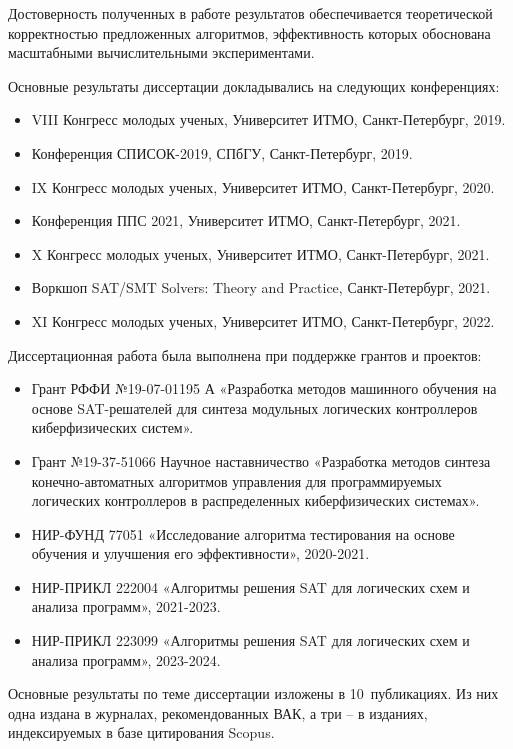 {\reliability}
%
Достоверность полученных в работе результатов обеспечивается теоретической корректностью предложенных алгоритмов, эффективность которых обоснована масштабными вычислительными экспериментами.


\probation
%
Основные результаты диссертации докладывались на следующих конференциях:
\begin{itemize}[beginpenalty=10000]
    \item VIII Конгресс молодых ученых, Университет ИТМО, Санкт-Петербург, 2019.
    \item Конференция СПИСОК-2019, СПбГУ, Санкт-Петербург, 2019.
    \item IX Конгресс молодых ученых, Университет ИТМО, Санкт-Петербург, 2020.
    \item Конференция ППС 2021, Университет ИТМО, Санкт-Петербург, 2021.
    \item X Конгресс молодых ученых, Университет ИТМО, Санкт-Петербург, 2021.
    \item Воркшоп SAT/SMT Solvers: Theory and Practice, Санкт-Петербург, 2021.
    \item XI Конгресс молодых ученых, Университет ИТМО, Санкт-Петербург, 2022.
\end{itemize}

Диссертационная работа была выполнена при поддержке грантов и проектов:
\begin{itemize}[beginpenalty=10000]
    \item Грант РФФИ №19-07-01195 А «Разработка методов машинного
    обучения на основе SAT-решателей для синтеза модульных логических контроллеров киберфизических систем».
    \item Грант №19-37-51066 Научное наставничество «Разработка методов синтеза конечно-автоматных алгоритмов управления для программируемых логических контроллеров в распределенных киберфизических системах».
    \item НИР-ФУНД 77051 «Исследование алгоритма тестирования на основе обучения и улучшения его эффективности», 2020-2021.
    \item НИР-ПРИКЛ 222004 «Алгоритмы решения SAT для логических схем и анализа программ», 2021-2023.
    \item НИР-ПРИКЛ 223099 «Алгоритмы решения SAT для логических схем и анализа программ», 2023-2024.
\end{itemize}


\publications
%
%
Основные результаты по теме диссертации изложены в 10~публикациях.
Из них одна издана в журналах, рекомендованных ВАК,
а три \--- в изданиях, индексируемых в базе цитирования Scopus.

